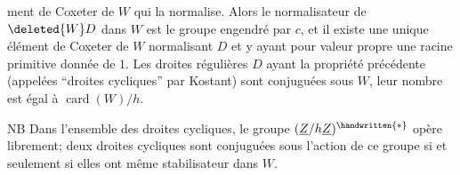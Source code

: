 ment de Coxeter de $W$ qui la normalise. Alors le normalisateur de $\deleted{W}D$ dans $W$ est le groupe engendré par $c$, et il existe une unique élément de Coxeter de $W$ normalisant $D$ et y ayant pour valeur propre une racine primitive donnée de $1$. Les droites régulières $D$ ayant la propriété précédente (appelées ``droites cycliques'' par Kostant) sont conjuguées sous $W$, leur nombre est égal à $\operatorname{card}(W)/h$.

NB Dans l'ensemble des droites cycliques, le groupe $(\underline{Z}/h\underline{Z})^{\handwritten{*}}$ opère librement; deux droites cycliques sont conjuguées sous l'action de ce groupe si et seulement si elles ont même stabilisateur dans $W$.
